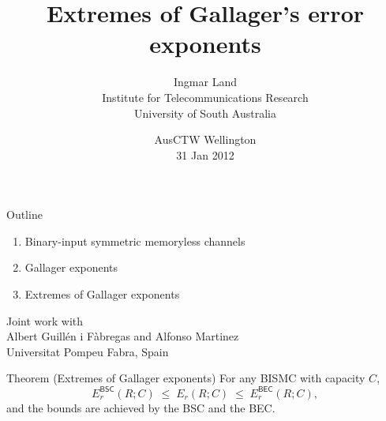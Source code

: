\documentclass[mathserif]{beamer}
\title{Extremes of Gallager's error exponents}
\author{%
Ingmar Land \\[1ex]
\footnotesize
Institute for Telecommunications Research \\
University of South Australia}
\date{AusCTW Wellington \\ 31 Jan 2012}
\newcommand{\BSC}{{\mathsf{BSC}}}
\newcommand{\BEC}{{\mathsf{BEC}}}
\begin{document}
\begin{frame}
  \titlepage
\end{frame}

\silence

\begin{frame}
  \frametitle{} 
  
  \centering
  \vspace{2ex}
  \begin{turn}{1}
  \hspace{4ex}
  \begin{minipage}{0.8\textwidth}
  \begin{block}{Outline}
    \begin{enumerate}
    \item Binary-input symmetric memoryless channels
    \item Gallager exponents
    \item Extremes of Gallager exponents
    \end{enumerate}
  \end{block}
  \end{minipage}
  \end{turn}
  
  \vspace{5ex}
  \begin{turn}{-1}
  \hspace{2ex}
  \begin{minipage}{0.8\textwidth}
  \begin{block}{}
    Joint work with \\
  Albert Guill\'en i F\`abregas and Alfonso Martinez \\
  Universitat Pompeu Fabra, Spain
  \end{block}
  \end{minipage}
  \end{turn}
\end{frame} 

\attention

\begin{frame}{}  
  \begin{block}{Theorem (Extremes of Gallager exponents)}
  \vspace{1ex}
  For any BISMC with capacity $C$,
  \begin{equation*}
    E_r^\BSC(R;C) \;\le\; E_r(R;C) \;\le\; E_r^\BEC(R;C) ,
  \end{equation*}
	and the bounds are achieved by the BSC and the BEC.
	\end{block}
\end{frame}
\end{document}
